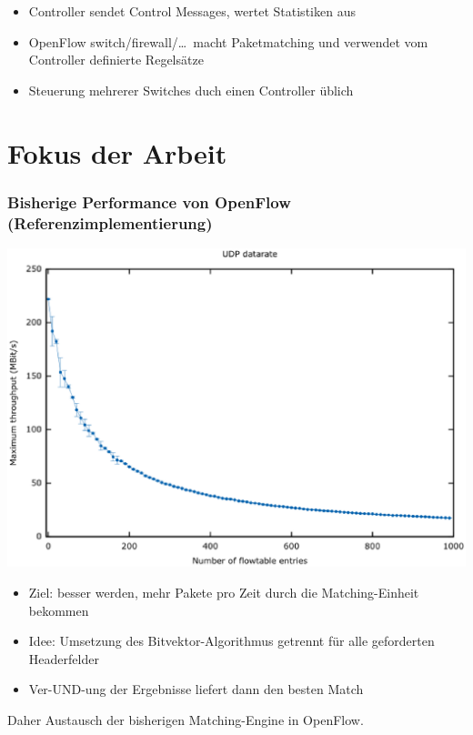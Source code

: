\documentclass{beamer}
\begin{document}
\begin{frame}
    \begin{itemize}
        \item Controller sendet Control Messages, wertet Statistiken aus
        \item OpenFlow switch/firewall/\dots\ macht Paketmatching und verwendet vom Controller definierte Regelsätze
        \item Steuerung mehrerer Switches duch einen Controller üblich
    \end{itemize}
\end{frame}

\section{Fokus der Arbeit}
\begin{frame}
\frametitle{Bisherige Performance von OpenFlow (Referenzimplementierung)}
\begin{center}
\includegraphics[height=0.7\textheight]{img/test_initial_long.eps}
\end{center}
\end{frame}

\begin{frame}
\begin{itemize}
    \item Ziel: besser werden, mehr Pakete pro Zeit durch die Matching-Einheit bekommen
    \item Idee: Umsetzung des Bitvektor-Algorithmus getrennt für alle geforderten Headerfelder
    \item Ver-UND-ung der Ergebnisse liefert dann den besten Match
\end{itemize}
Daher Austausch der bisherigen Matching-Engine in OpenFlow.
\end{frame}
\end{document}
